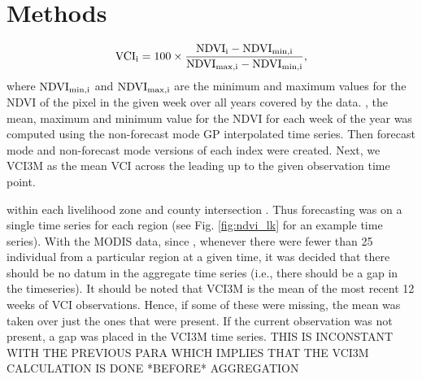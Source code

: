 \documentclass[review]{elsarticle}
\begin{document}
\section{Methods}
\begin{equation}
\rm{VCI}_i = 100 \times \frac{\rm{NDVI}_i - \rm{NDVI}_{min,i}}{ \rm{NDVI}_{max,i} - \rm{NDVI}_{min,i}},
\label{vci_eq}
\end{equation}
%
where $\rm{NDVI}_{min,i}$ and $\rm{NDVI}_{max,i}$ are the minimum and maximum values for the NDVI of the pixel in the given week over all years covered by the data. , the mean, maximum and minimum value for the NDVI for each week of the year
was computed using the non-forecast mode GP interpolated time series. Then forecast mode and non-forecast mode versions of each index were created. Next, we  VCI3M as the mean VCI across the  leading up to the given observation time point.


  within each livelihood zone and county intersection . Thus forecasting was  on a single time series for each region (see Fig. \ref{fig:ndvi_lk} for an example time series). With the MODIS data, since , whenever there were fewer than 25 individual  from a particular region at a given time, it was decided that there should be no datum in the aggregate time series (i.e., there should be a gap in the timeseries). It should be noted that VCI3M is the mean of the most recent 12 weeks of VCI observations. Hence, if some of these were missing, the mean was taken over just the ones that were present. If the current observation was not present, a gap was placed in the VCI3M time series. {\color{red} THIS IS INCONSTANT WITH THE PREVIOUS PARA WHICH IMPLIES THAT THE VCI3M CALCULATION IS DONE *BEFORE* AGGREGATION}
\end{document}
